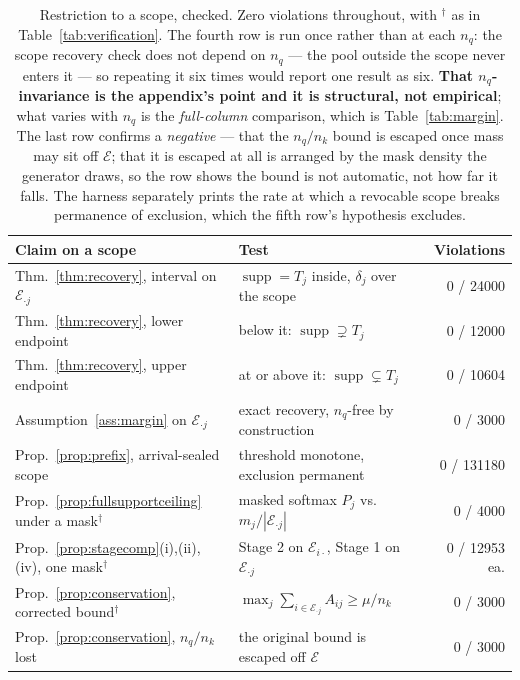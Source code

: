 \documentclass{article}
\newcommand{\supp}{\operatorname{supp}}
\begin{document}
\begin{table}[h]
\centering
\caption{Restriction to a scope, checked. Zero violations throughout, with $^{\dagger}$ as in
Table~\ref{tab:verification}. The fourth row is run once rather than at each $n_q$: the scope
recovery check does not depend on $n_q$ --- the pool outside the scope never enters it --- so
repeating it six times would report one result as six. \textbf{That $n_q$-invariance is the
appendix's point and it is structural, not empirical}; what varies with $n_q$ is the
\emph{full-column} comparison, which is Table~\ref{tab:margin}. The last row confirms a
\emph{negative} --- that the $n_q/n_k$ bound is escaped once mass may sit off $\mathcal{E}$;
that it is escaped at all is arranged by the mask density the generator draws, so the row shows
the bound is not automatic, not how far it falls. The harness separately prints the rate at which
a revocable scope breaks permanence of exclusion, which the fifth row's hypothesis excludes.}
\label{tab:transferchecks}
\scriptsize
\setlength{\tabcolsep}{3.5pt}
\begin{tabular}{@{}llr@{}}
\toprule
\textbf{Claim on a scope} & \textbf{Test} & \textbf{Violations} \\
\midrule
Thm.~\ref{thm:recovery}, interval on $\mathcal{E}_{\cdot j}$ & $\supp=T_j$ inside, $\delta_j$ over the scope & 0 / 24000 \\
Thm.~\ref{thm:recovery}, lower endpoint & below it: $\supp\supsetneq T_j$ & 0 / 12000 \\
Thm.~\ref{thm:recovery}, upper endpoint & at or above it: $\supp\subsetneq T_j$ & 0 / 10604 \\
Assumption~\ref{ass:margin} on $\mathcal{E}_{\cdot j}$ & exact recovery, $n_q$-free by construction & 0 / 3000 \\
Prop.~\ref{prop:prefix}, arrival-sealed scope & threshold monotone, exclusion permanent & 0 / 131180 \\
Prop.~\ref{prop:fullsupportceiling} under a mask$^{\dagger}$ & masked softmax $P_j$ vs.\ $m_j/|\mathcal{E}_{\cdot j}|$ & 0 / 4000 \\
Prop.~\ref{prop:stagecomp}(i),(ii),(iv), one mask$^{\dagger}$ & Stage 2 on $\mathcal{E}_{i\cdot}$, Stage 1 on $\mathcal{E}_{\cdot j}$ & 0 / 12953 ea. \\
Prop.~\ref{prop:conservation}, corrected bound$^{\dagger}$ & $\max_j\sum_{i\in\mathcal{E}_{\cdot j}}A_{ij}\ge\mu/n_k$ & 0 / 3000 \\
Prop.~\ref{prop:conservation}, $n_q/n_k$ lost & the original bound is escaped off $\mathcal{E}$ & 0 / 3000 \\
\bottomrule
\end{tabular}
\end{table}
\end{document}
